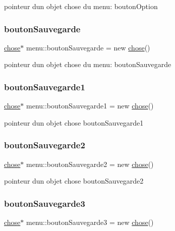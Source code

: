 pointeur d\textquotesingle{}un objet chose du menu\+: bouton\+Option \mbox{\label{classmenu_ab904094fecec2d69ecf92512dad4c2c6}} 
\subsubsection{\texorpdfstring{bouton\+Sauvegarde}{boutonSauvegarde}}
{\footnotesize\ttfamily \mbox{\hyperlink{classchose}{chose}}$\ast$ menu\+::bouton\+Sauvegarde = new \mbox{\hyperlink{classchose}{chose}}()}

pointeur d\textquotesingle{}un objet chose du menu\+: bouton\+Sauvegarde \mbox{\label{classmenu_a1b8fc8c5fd7494565d5da06bc6f10873}} 
\subsubsection{\texorpdfstring{bouton\+Sauvegarde1}{boutonSauvegarde1}}
{\footnotesize\ttfamily \mbox{\hyperlink{classchose}{chose}}$\ast$ menu\+::bouton\+Sauvegarde1 = new \mbox{\hyperlink{classchose}{chose}}()}

pointeur d\textquotesingle{}un objet chose bouton\+Sauvegarde1 \mbox{\label{classmenu_a51d5cbcc3b92d8b4deac94e6dc9486f5}} 
\subsubsection{\texorpdfstring{bouton\+Sauvegarde2}{boutonSauvegarde2}}
{\footnotesize\ttfamily \mbox{\hyperlink{classchose}{chose}}$\ast$ menu\+::bouton\+Sauvegarde2 = new \mbox{\hyperlink{classchose}{chose}}()}

pointeur d\textquotesingle{}un objet chose bouton\+Sauvegarde2 \mbox{\label{classmenu_a50f231644fcb472c3ac583df94a5f485}} 
\subsubsection{\texorpdfstring{bouton\+Sauvegarde3}{boutonSauvegarde3}}
{\footnotesize\ttfamily \mbox{\hyperlink{classchose}{chose}}$\ast$ menu\+::bouton\+Sauvegarde3 = new \mbox{\hyperlink{classchose}{chose}}()}

